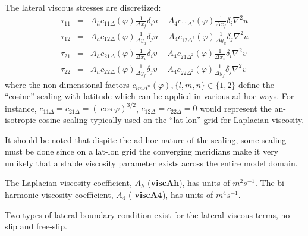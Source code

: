 The lateral viscous stresses are discretized:
\begin{eqnarray}
\tau_{11} & = & A_h c_{11\Delta}(\varphi) \frac{1}{\Delta x_f} \delta_i u
               -A_4 c_{11\Delta^2}(\varphi) \frac{1}{\Delta x_f} \delta_i \nabla^2 u \\
\tau_{12} & = & A_h c_{12\Delta}(\varphi) \frac{1}{\Delta y_u} \delta_j u
               -A_4 c_{12\Delta^2}(\varphi)\frac{1}{\Delta y_u} \delta_j \nabla^2 u \\
\tau_{21} & = & A_h c_{21\Delta}(\varphi) \frac{1}{\Delta x_v} \delta_i v
               -A_4 c_{21\Delta^2}(\varphi) \frac{1}{\Delta x_v} \delta_i \nabla^2 v \\
\tau_{22} & = & A_h c_{22\Delta}(\varphi) \frac{1}{\Delta y_f} \delta_j v
               -A_4 c_{22\Delta^2}(\varphi) \frac{1}{\Delta y_f} \delta_j \nabla^2 v
\end{eqnarray}
where the non-dimensional factors $c_{lm\Delta^n}(\varphi), \{l,m,n\} \in
\{1,2\}$ define the ``cosine'' scaling with latitude which can be
applied in various ad-hoc ways. For instance, $c_{11\Delta} =
c_{21\Delta} = (\cos{\varphi})^{3/2}$, $c_{12\Delta}=c_{22\Delta}=0$ would
represent the an-isotropic cosine scaling typically used on the
``lat-lon'' grid for Laplacian viscosity.

It should be noted that dispite the ad-hoc nature of the scaling, some
scaling must be done since on a lat-lon grid the converging meridians
make it very unlikely that a stable viscosity parameter exists across
the entire model domain.

The Laplacian viscosity coefficient, $A_h$ ({\bf viscAh}), has units
of $m^2 s^{-1}$. The bi-harmonic viscosity coefficient, $A_4$ ({\bf
viscA4}), has units of $m^4 s^{-1}$.


Two types of lateral boundary condition exist for the lateral viscous
terms, no-slip and free-slip.

